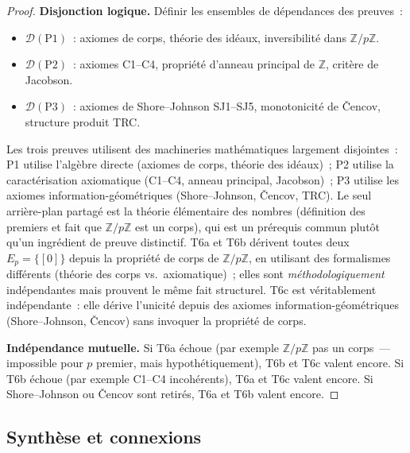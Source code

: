 \documentclass[12pt,a4paper]{article}
\begin{document}
\begin{theoreme}
\begin{proof}
\textbf{Disjonction logique.} Définir les ensembles de dépendances
des preuves~:
\begin{itemize}[nosep]
\item $\mathcal{D}(\text{P1})$~: axiomes de corps, théorie des
  idéaux, inversibilité dans $\mathbb{Z}/p\mathbb{Z}$.
\item $\mathcal{D}(\text{P2})$~: axiomes C1--C4, propriété d'anneau
  principal de $\mathbb{Z}$, critère de Jacobson.
\item $\mathcal{D}(\text{P3})$~: axiomes de Shore--Johnson SJ1--SJ5,
  monotonicité de \v{C}encov, structure produit TRC.
\end{itemize}
Les trois preuves utilisent des machineries mathématiques largement
disjointes~: P1 utilise l'algèbre directe (axiomes de corps, théorie
des idéaux)~; P2 utilise la caractérisation axiomatique (C1--C4,
anneau principal, Jacobson)~; P3 utilise les axiomes
information-géométriques (Shore--Johnson, \v{C}encov, TRC). Le seul
arrière-plan partagé est la théorie élémentaire des nombres
(définition des premiers et fait que $\mathbb{Z}/p\mathbb{Z}$ est un
corps), qui est un prérequis commun plutôt qu'un ingrédient de preuve
distinctif. T6a et T6b dérivent toutes deux $E_p = \{[0]\}$ depuis la
propriété de corps de $\mathbb{Z}/p\mathbb{Z}$, en utilisant des
formalismes différents (théorie des corps vs.\ axiomatique)~;
elles sont \emph{méthodologiquement} indépendantes mais prouvent le
même fait structurel. T6c est véritablement indépendante~: elle
dérive l'unicité depuis des axiomes information-géométriques
(Shore--Johnson, \v{C}encov) sans invoquer la propriété de corps.

\textbf{Indépendance mutuelle.} Si T6a échoue (par exemple
$\mathbb{Z}/p\mathbb{Z}$ pas un corps~--- impossible pour $p$ premier,
mais hypothétiquement), T6b et T6c valent encore. Si T6b échoue
(par exemple C1--C4 incohérents), T6a et T6c valent encore. Si
Shore--Johnson ou \v{C}encov sont retirés, T6a et T6b valent encore.
\end{proof}
\end{theoreme}

\subsection{Synthèse et connexions}
\label{sec:ch2_summary}
\end{document}
